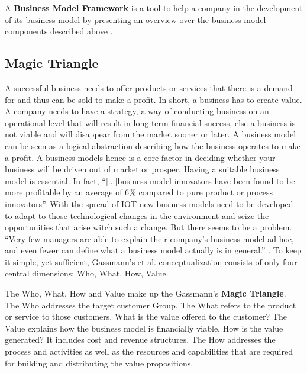 		 A \textbf{Business Model Framework} is a tool to help a company in the development of its business model by presenting an overview over the business model components described above \cite{dijkman}. 

	\subsection{Magic Triangle}
		A successful business needs to offer products or services that there is a demand for and thus can be sold to make a profit. In short, a business has to create value. A company needs to have a strategy, a way of conducting business on an operational level that will result in long term financial success, else a business is not viable and will disappear from the market sooner or later.
		A business model can be seen as a logical abstraction describing how the business operates to make a profit. A business models hence is a core factor in deciding whether your business will be driven out of market or prosper. Having a suitable business model is essential. In fact, ``[...]business model innovators have been found to be more profitable by an average of 6\% compared to pure product or process innovators''\cite[p.90]{gassmann55}. With the spread of IOT new business models need to be developed to adapt to those technological changes in the environment and seize the opportunities that arise witch such a change. But there seems to be a problem. ``Very few managers are able to explain their company’s business model ad-hoc, and even fewer can define what a business model actually is in general.'' \cite[p.90]{gassmann55}. To keep it simple, yet sufficient, Gassmann's et al.  conceptualization consists of only four central dimensions: Who, What, How, Value. 

		The Who, What, How and Value make up the Gassmann's \textbf{Magic Triangle}. The Who addresses the target customer Group. The What refers to the product or service to those customers. What is the value offered to the customer? The Value explains how the business model is financially viable. How is the value generated? It includes cost and revenue structures. The How addresses the process and activities as well as the resources and capabilities that are required for building and distributing the value propositions.		
					
